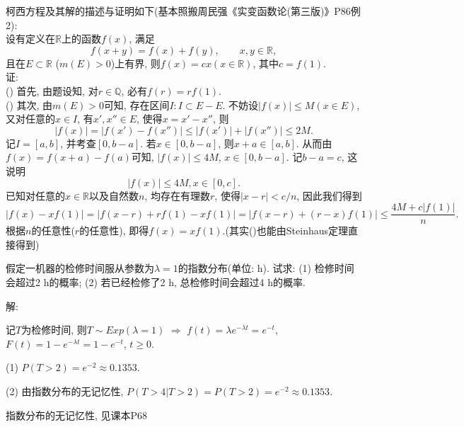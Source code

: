 \documentclass[standard]{ExBook}
\begin{document}
\begin{qitems}
\begin{bbox}
\textcolor{themeColor}{\selectfont {} 柯西方程及其解的描述与证明如下(基本照搬周民强《实变函数论(第三版)》P86例2):\\
设有定义在$\mathbb{R}$上的函数$f(x)$, 满足
$$f(x+y)=f(x)+f(y),\qquad x,y\in\mathbb{R},$$
且在$E\subset\mathbb{R}$ ($m(E)>0$)上有界, 则$f(x)=cx(x\in\mathbb{R})$, 其中$c=f(1)$.\\
证:\\
() 首先, 由题设知, 对$r\in\mathbb{Q}$, 必有$f(r)=rf(1)$.\\
() 其次, 由$m(E)>0$可知, 存在区间$I:I\subset E-E$. 不妨设$|f(x)|\leq M(x\in E)$, 又对任意的$x\in I$, 有$x',x''\in E$, 使得$x=x'-x''$, 则
$$|f(x)|=|f(x')-f(x'')|\leq |f(x')|+|f(x'')|\leq 2M.$$
记$I=[a,b]$, 并考查$[0,b-a]$. 若$x \in [0,b-a]$, 则$x+a\in[a,b]$. 从而由$f(x)=f(x+a)-f(a)$可知, $|f(x)|\leq 4M$, $x\in[0,b-a]$. 记$b-a=c$, 这说明
$$|f(x)|\leq 4M,x\in[0,c].$$
已知对任意的$x\in\mathbb{R}$以及自然数$n$, 均存在有理数$r$, 使得$|x-r|<c/n$, 因此我们得到
$$|f(x)-xf(1)|=|f(x-r)+rf(1)-xf(1)|=|f(x-r)+(r-x)f(1)|\leq \frac{4M+c|f(1)|}{n}.$$
根据$n$的任意性($r$的任意性), 即得$f(x)=xf(1)$.\qquad(其实()也能由Steinhaus定理直接得到)} 
    \end{bbox}

\vspace{-5em}

    \begin{bbox}
    \begin{shaded}
        \qitem
假定一机器的检修时间服从参数为$\lambda=1$的指数分布(单位: h). 试求: 
(1) 检修时间会超过2 h的概率;
(2) 若已经检修了2 h, 总检修时间会超过4 h的概率.
    \end{shaded}
    \end{bbox}

\vspace{-5em}

    \begin{bbox}
解: 

记$T$为检修时间, 则$T\sim Exp(\lambda=1)$ $\Longrightarrow$ $f(t)=\lambda e^{-\lambda t}=e^{-t}$, $F(t)=1-e^{-\lambda t}=1-e^{-t}$, $t\geq 0$. 

(1) $P(T>2)=e^{-2}\approx0.1353$.

(2) 由指数分布的无记忆性, $P(T>4|T>2)=P(T>2)=e^{-2}\approx0.1353$.

\textcolor{themeColor}{\selectfont {} 指数分布的无记忆性, 见课本P68}
    \end{bbox}


\end{qitems}
\end{document}
